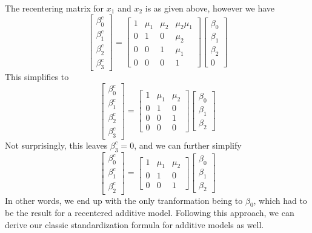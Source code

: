 \documentclass[]{article}
\begin{document}
The recentering matrix for \(x_1\) and \(x_2\) is as given above,
however we have
\[\begin{bmatrix}\beta_0^c \\ \beta_1^c \\ \beta_2^c \\ \beta_3^c \end{bmatrix}=
\begin{bmatrix} 1 & \mu_1 &\mu_2 &\mu_2\mu_1 \\
  0 &1 &0 &\mu_2 \\ 0 &0 &1 &\mu_1 \\ 0 &0 &0 &1 \end{bmatrix}
\begin{bmatrix}\beta_0 \\ \beta_1 \\ \beta_2 \\ 0 \end{bmatrix}\] This
simplifies to
\[\begin{bmatrix}\beta_0^c \\ \beta_1^c \\ \beta_2^c  \\ \beta_3^c \end{bmatrix}=
\begin{bmatrix} 1 & \mu_1 &\mu_2 \\
  0 &1 &0 \\ 0 &0 &1 \\ 0 &0 &0 \end{bmatrix}
\begin{bmatrix}\beta_0 \\ \beta_1 \\ \beta_2 \end{bmatrix}\] Not
surprisingly, this leaves \(\beta_3^c=0\), and we can further simplify
\[\begin{bmatrix}\beta_0^c \\ \beta_1^c \\ \beta_2^c \end{bmatrix}=
\begin{bmatrix} 1 & \mu_1 &\mu_2 \\
  0 &1 &0 \\ 0 &0 &1 \end{bmatrix}
\begin{bmatrix}\beta_0 \\ \beta_1 \\ \beta_2 \end{bmatrix}\] In other
words, we end up with the only tranformation being to \(\beta_0\), which
had to be the result for a recentered additive model. Following this
approach, we can derive our classic standardization formula for additive
models as well.
\end{document}
